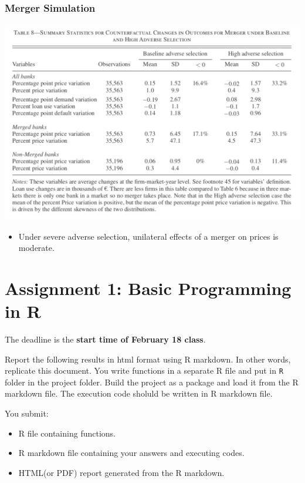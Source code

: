 \documentclass[
]{book}
\providecommand{\tightlist}{%
  \setlength{\itemsep}{0pt}\setlength{\parskip}{0pt}}
\begin{document}
\hypertarget{merger-simulation-2}{%
\subsection{Merger Simulation}\label{merger-simulation-2}}

\includegraphics{figuretable/Crawford_2018_Table8.png}

\begin{itemize}
\tightlist
\item
  Under severe adverse selection, unilateral effects of a merger on prices is moderate.
\end{itemize}

\hypertarget{assignment1}{%
\chapter{Assignment 1: Basic Programming in R}\label{assignment1}}

The deadline is the \textbf{start time of February 18 class}.

Report the following results in html format using R markdown. In other words, replicate this document. You write functions in a separate R file and put in \texttt{R} folder in the project folder. Build the project as a package and load it from the R markdown file. The execution code sholuld be written in R markdown file.

You submit:

\begin{itemize}
\tightlist
\item
  R file containing functions.
\item
  R markdown file containing your answers and executing codes.
\item
  HTML(or PDF) report generated from the R markdown.
\end{itemize}
\end{document}
